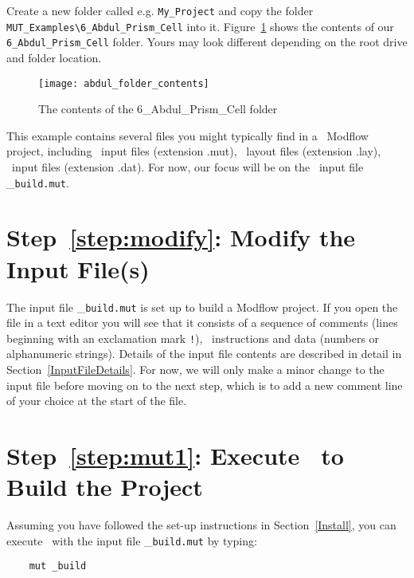 Create a new folder called e.g. \verb+My_Project+ and copy the folder \verb+MUT_Examples\6_Abdul_Prism_Cell+ into it.
Figure~\ref{fig:my_project} shows the contents of our \verb+6_Abdul_Prism_Cell+ folder.  Yours may look different depending on the root drive and folder location.
\begin{figure}[h!]
    \centering
    \texttt{[image: abdul\_folder\_contents]}
    \caption{The contents of the 6\_Abdul\_Prism\_Cell folder}
    \label{fig:my_project}
\end{figure}

This example contains several files you might typically find in a \mut\ Modflow project, including \mut\ input files (extension .mut), \tecplot\ layout files (extension .lay), \tecplot\ input files (extension .dat).  For now, our focus will be on the \mut\ input file \_\verb+build.mut+.

\section*{Step~\ref{step:modify}: Modify the Input File(s)}
The input file \_\verb+build.mut+ is set up to build a Modflow project.  If you open the file in a text editor you will see that it consists of a sequence of comments (lines beginning with an exclamation mark \verb+!+), \mut\ instructions and data (numbers or alphanumeric strings).  Details of the input file contents are described in detail in Section~\ref{InputFileDetails}.  For now, we will only make a minor change to the input file before moving on to the next step, which is to add a new comment line of your choice at the start of the file.

\section*{Step~\ref{step:mut1}: Execute \mut\ to Build the Project}


Assuming you have followed the set-up instructions in Section~\ref{Install}, you can execute \mut\ with the input file \_\verb+build.mut+ by typing:
\begin{verbatim}
    mut _build
\end{verbatim}


